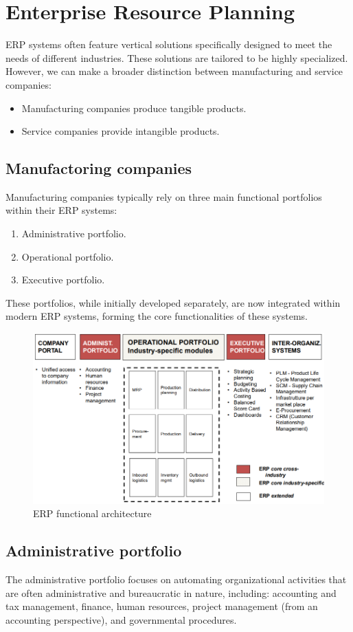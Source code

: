 \section{Enterprise Resource Planning}

ERP systems often feature vertical solutions specifically designed to meet the needs of different industries. 
These solutions are tailored to be highly specialized.
However, we can make a broader distinction between manufacturing and service companies:
\begin{itemize}
    \item Manufacturing companies produce tangible products.
    \item Service companies provide intangible products.
\end{itemize}

\subsection{Manufactoring companies}
Manufacturing companies typically rely on three main functional portfolios within their ERP systems:
\begin{enumerate}
    \item Administrative portfolio.
    \item Operational portfolio.
    \item Executive portfolio.
\end{enumerate}
\noindent These portfolios, while initially developed separately, are now integrated within modern ERP systems, forming the core functionalities of these systems.

\begin{figure}[H]
    \centering
    \includegraphics[width=0.5\linewidth]{images/bis1.png}
    \caption{ERP functional architecture}
\end{figure}

\subsection{Administrative portfolio}
The administrative portfolio focuses on automating organizational activities that are often administrative and bureaucratic in nature, including: accounting and tax management, finance, human resources, project management (from an accounting perspective), and governmental procedures.

